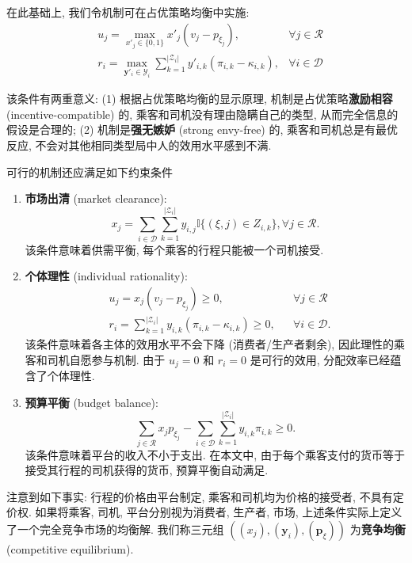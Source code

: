\documentclass[10pt,twocolumn]{article}
\begin{document}
在此基础上, 我们令机制可在占优策略均衡中实施:
\begin{align}
  \label{eq:dominant-1}
   & u_j = \max_{x'_j\in \{0,1\}} x'_j(v_j - p_{\xi_j}),                                                         & \forall j\in\mathcal{R} \\
  \label{eq:dominant-2}
   & r_i = \max_{\mathbf{y}'_i\in \mathcal{Y}_i} \sum_{k=1}^{|\mathcal{Z}_i|} y'_{i,k} (\pi_{i,k}-\kappa_{i,k}), & \forall i\in\mathcal{D}
\end{align}

该条件有两重意义: (1) 根据占优策略均衡的显示原理, 机制是占优策略\textbf{激励相容} (incentive-compatible) 的, 乘客和司机没有理由隐瞒自己的类型, 从而完全信息的假设是合理的; (2) 机制是\textbf{强无嫉妒} (strong envy-free) 的, 乘客和司机总是有最优反应, 不会对其他相同类型局中人的效用水平感到不满.

可行的机制还应满足如下约束条件

\begin{enumerate}
  \item \textbf{市场出清} (market clearance): $$x_j = \sum_{i\in\mathcal{D}}\sum_{k=1}^{|\mathcal{Z}_i|} y_{i,j} \mathbb{I}\{(\xi, j)\in Z_{i,k}\}, \forall j\in\mathcal{R}.$$ 该条件意味着供需平衡, 每个乘客的行程只能被一个司机接受.

  \item \textbf{个体理性} (individual rationality):
    $$
      \begin{aligned}
         & u_j = x_j (v_j - p_{\xi_j}) \ge 0,                                         &  & \forall j\in\mathcal{R}  \\
         & r_i = \sum_{k=1}^{|\mathcal{Z}_i|} y_{i,k} (\pi_{i,k}-\kappa_{i,k}) \ge 0, &  & \forall i\in\mathcal{D}.
      \end{aligned}
    $$
    该条件意味着各主体的效用水平不会下降 (消费者/生产者剩余), 因此理性的乘客和司机自愿参与机制. 由于 $u_j = 0$ 和 $r_i = 0$ 是可行的效用, 分配效率已经蕴含了个体理性.

  \item \textbf{预算平衡} (budget balance): $$\sum_{j\in\mathcal{R}} x_j p_{\xi_j} - \sum_{i\in\mathcal{D}} \sum_{k=1}^{|\mathcal{Z}_i|} y_{i,k} \pi_{i,k} \ge 0.$$ 该条件意味着平台的收入不小于支出. 在本文中, 由于每个乘客支付的货币等于接受其行程的司机获得的货币, 预算平衡自动满足.
\end{enumerate}

注意到如下事实: 行程的价格由平台制定, 乘客和司机均为价格的接受者, 不具有定价权. 如果将乘客, 司机, 平台分别视为消费者, 生产者, 市场, 上述条件实际上定义了一个完全竞争市场的均衡解. 我们称三元组 $((x_j), (\mathbf{y}_i), (\mathbf{p}_\xi))$ 为\textbf{竞争均衡} (competitive equilibrium).
\end{document}
